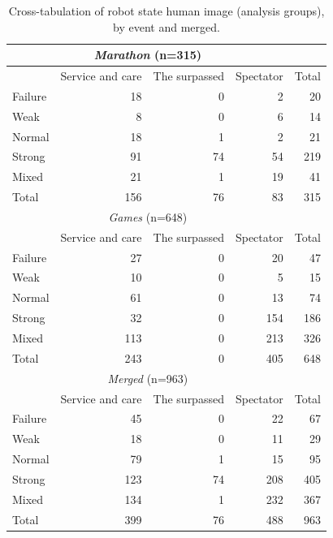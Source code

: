 \begin{table}[t]
  \centering
  \caption{Cross-tabulation of robot state \times human image (analysis groups), by event and merged.}
  \label{tab:app-cross}
  \begin{tabular}{lrrrr}
    \toprule
  \multicolumn{4}{c}{ \textit{Marathon} (n=315) } \\
  \midrule
  & Service and care & The surpassed & Spectator & Total \\
  \midrule
  Failure & 18 & 0 & 2 & 20 \\
  Weak & 8 & 0 & 6 & 14 \\
  Normal & 18 & 1 & 2 & 21 \\
  Strong & 91 & 74 & 54 & 219 \\
  Mixed & 21 & 1 & 19 & 41 \\
  \midrule
  Total & 156 & 76 & 83 & 315 \\
    \midrule
  \multicolumn{4}{c}{ \textit{Games} (n=648) } \\
  \midrule
  & Service and care & The surpassed & Spectator & Total \\
  \midrule
  Failure & 27 & 0 & 20 & 47 \\
  Weak & 10 & 0 & 5 & 15 \\
  Normal & 61 & 0 & 13 & 74 \\
  Strong & 32 & 0 & 154 & 186 \\
  Mixed & 113 & 0 & 213 & 326 \\
  \midrule
  Total & 243 & 0 & 405 & 648 \\
    \midrule
  \multicolumn{4}{c}{ \textit{Merged} (n=963) } \\
  \midrule
  & Service and care & The surpassed & Spectator & Total \\
  \midrule
  Failure & 45 & 0 & 22 & 67 \\
  Weak & 18 & 0 & 11 & 29 \\
  Normal & 79 & 1 & 15 & 95 \\
  Strong & 123 & 74 & 208 & 405 \\
  Mixed & 134 & 1 & 232 & 367 \\
  \midrule
  Total & 399 & 76 & 488 & 963 \\
    \bottomrule
  \end{tabular}
\end{table}